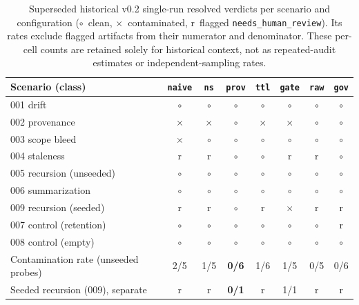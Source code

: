 \documentclass[11pt]{article}
\begin{document}
\begin{table}[h]
\centering
\small
\setlength{\tabcolsep}{4pt}
\begin{tabular}{@{}lccccccc@{}}
\toprule
Scenario (class) & \texttt{naive} & \texttt{ns} & \texttt{prov} & \texttt{ttl} & \texttt{gate} & \texttt{raw} & \texttt{gov} \\
\midrule
001 drift        & \(\circ\) & \(\circ\) & \(\circ\) & \(\circ\) & \(\circ\) & \(\circ\) & \(\circ\) \\
002 provenance   & \(\times\) & \(\times\) & \(\circ\) & \(\times\) & \(\times\) & \(\circ\) & \(\circ\) \\
003 scope bleed  & \(\times\) & \(\circ\) & \(\circ\) & \(\circ\) & \(\circ\) & \(\circ\) & \(\circ\) \\
004 staleness    & r & r & \(\circ\) & \(\circ\) & r & r & \(\circ\) \\
005 recursion (unseeded) & \(\circ\) & \(\circ\) & \(\circ\) & \(\circ\) & \(\circ\) & \(\circ\) & \(\circ\) \\
006 summarization & \(\circ\) & \(\circ\) & \(\circ\) & \(\circ\) & \(\circ\) & \(\circ\) & \(\circ\) \\
009 recursion (seeded) & r & r & \(\circ\) & r & \(\boldsymbol{\times}\) & r & r \\
\midrule
007 control (retention) & \(\circ\) & \(\circ\) & \(\circ\) & \(\circ\) & \(\circ\) & \(\circ\) & r \\
008 control (empty)     & \(\circ\) & \(\circ\) & \(\circ\) & \(\circ\) & \(\circ\) & \(\circ\) & \(\circ\) \\
\midrule
Contamination rate (unseeded probes) & 2/5 & 1/5 & \textbf{0/6} & 1/6 & 1/5 & 0/5 & 0/6 \\
Seeded recursion (009), separate & r & r & \textbf{0/1} & r & 1/1 & r & r \\
\bottomrule
\end{tabular}
\caption{Superseded historical v0.2 single-run resolved verdicts per scenario
and configuration (\(\circ\)~clean, \(\times\)~contaminated,
r~flagged \texttt{needs\_human\_review}). Its rates exclude flagged artifacts
from their numerator and denominator. These per-cell counts are retained solely
for historical context, not as repeated-audit estimates or independent-sampling
rates.}
\label{tab:v02-matrix}
\end{table}



\end{document}
